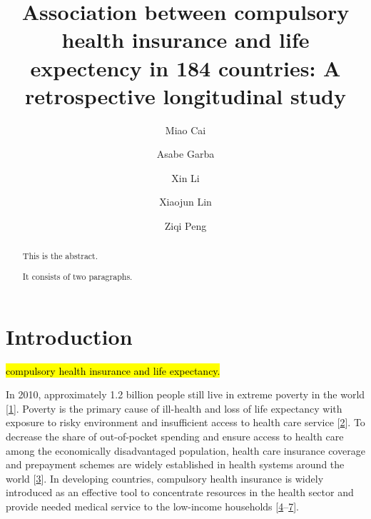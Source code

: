 \documentclass[]{elsarticle} %
\begin{document}
\begin{frontmatter}

  \title{Association between compulsory health insurance and life expectency in 184 countries: A retrospective longitudinal study}
    \author[SLU]{Miao Cai}
  
    \author[SLU]{Asabe Garba}
  
    \author[WHU]{Xin Li}
  
    \author[SCU]{Xiaojun Lin}
    \author[SLU]{Ziqi Peng}
  
      \address[SLU]{College for Public Health and Social Justice, Saint Louis University, Saint Louis, MO, 63108}
    \address[SCU]{West China School of Public Health, Sichuan University, Chengdu, Sichuan, China, 610044}
    \address[WHU]{School of Information Management, Wuhan University, Wuhan, Hubei, China, 430072}
  
  \begin{abstract}
  This is the abstract.
  
  It consists of two paragraphs.
  \end{abstract}
  
 \end{frontmatter}

\newcommand{\blandscape}{\begin{landscape}}
\newcommand{\elandscape}{\end{landscape}}
\doublespacing

\hypertarget{introduction}{%
\section{Introduction}\label{introduction}}

\hl{compulsory health insurance and life expectancy.}

In 2010, approximately 1.2 billion people still live in extreme poverty in the world {[}\protect\hyperlink{ref-olinto2013state}{1}{]}.
Poverty is the primary cause of ill-health and loss of life expectancy with exposure to risky environment and insufficient access to health care service {[}\protect\hyperlink{ref-world2001dying}{2}{]}.
To decrease the share of out-of-pocket spending and ensure access to health care among the economically disadvantaged population, health care insurance coverage and prepayment schemes are widely established in health systems around the world {[}\protect\hyperlink{ref-wagstaff2018progress}{3}{]}.
In developing countries, compulsory health insurance is widely introduced as an effective tool to concentrate resources in the health sector and provide needed medical service to the low-income households {[}\protect\hyperlink{ref-abel1992health}{4}--\protect\hyperlink{ref-ensor1999developing}{7}{]}.
\end{document}
